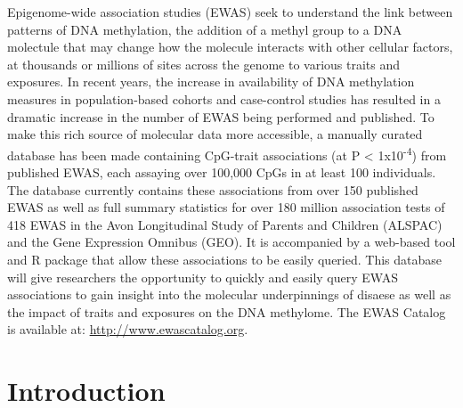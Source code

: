 \documentclass[11pt,twoside]{bristolthesis}
\begin{document}
Epigenome-wide association studies (EWAS) seek to understand the link between patterns of DNA methylation, the addition of a methyl group to a DNA molectule that may change how the molecule interacts with other cellular factors, at thousands or millions of sites across the genome to various traits and exposures. In recent years, the increase in availability of DNA methylation measures in population-based cohorts and case-control studies has resulted in a dramatic increase in the number of EWAS being performed and published. To make this rich source of molecular data more accessible, a manually curated database has been made containing CpG-trait associations (at P \textless{} 1x10\textsuperscript{-4}) from published EWAS, each assaying over 100,000 CpGs in at least 100 individuals. The database currently contains these associations from over 150 published EWAS as well as full summary statistics for over 180 million association tests of 418 EWAS in the Avon Longitudinal Study of Parents and Children (ALSPAC) and the Gene Expression Omnibus (GEO). It is accompanied by a web-based tool and R package that allow these associations to be easily queried. This database will give researchers the opportunity to quickly and easily query EWAS associations to gain insight into the molecular underpinnings of disaese as well as the impact of traits and exposures on the DNA methylome. The EWAS Catalog is available at: \url{http://www.ewascatalog.org}.

\hypertarget{introduction-1}{%
\section{Introduction}\label{introduction-1}}
\end{document}
